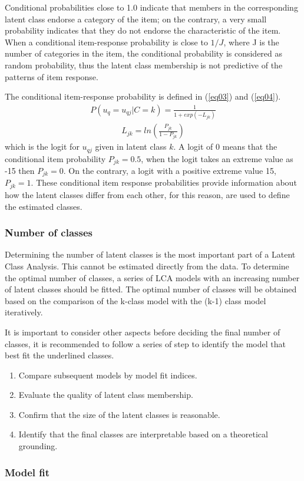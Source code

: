 \documentclass[12pt,a4paper,oneside]{reedthesis}
\providecommand{\tightlist}{%
  \setlength{\itemsep}{0pt}\setlength{\parskip}{0pt}}
\begin{document}
Conditional probabilities close to 1.0 indicate that members in the corresponding latent class endorse a category of the item; on the contrary, a very small probability indicates that they do not endorse the characteristic of the item. When a conditional item-response probability is close to \(1/J\), where J is the number of categories in the item, the conditional probability is considered as random probability, thus the latent class membership is not predictive of the patterns of item response.

The conditional item-response probability is defined in (\ref{eq03}) and (\ref{eq04}).
\begin{align}
P(u_q = u_{qj}|C=k) = \frac{1}{1+exp(-L_{jk})} \label{eq03}
\end{align}
\begin{align}
L_{jk}=ln(\frac{P_{jk}}{1-P_{jk}}) \label{eq04}
\end{align}
which is the logit for \(u_{qj}\) given in latent class \(k\). A logit of 0 means that the conditional item probability \(P_{jk}=0.5\), when the logit takes an extreme value as -15 then \(P_{jk}=0\). On the contrary, a logit with a positive extreme value 15, \(P_{jk}=1\). These conditional item response probabilities provide information about how the latent classes differ from each other, for this reason, are used to define the estimated classes.

\hypertarget{number-of-classes}{%
\subsubsection{Number of classes}\label{number-of-classes}}

Determining the number of latent classes is the most important part of a Latent Class Analysis. This cannot be estimated directly from the data. To determine the optimal number of classes, a series of LCA models with an increasing number of latent classes should be fitted. The optimal number of classes will be obtained based on the comparison of the k-class model with the (k-1) class model iteratively.

It is important to consider other aspects before deciding the final number of classes, it is recommended to follow a series of step to identify the model that best fit the underlined classes.
\begin{enumerate}
\def\labelenumi{\alph{enumi})}
\tightlist
\item
  Compare subsequent models by model fit indices.\\
\item
  Evaluate the quality of latent class membership.\\
\item
  Confirm that the size of the latent classes is reasonable.\\
\item
  Identify that the final classes are interpretable based on a theoretical grounding.
\end{enumerate}
\hypertarget{model-fit}{%
\subsubsection{Model fit}\label{model-fit}}
\end{document}

